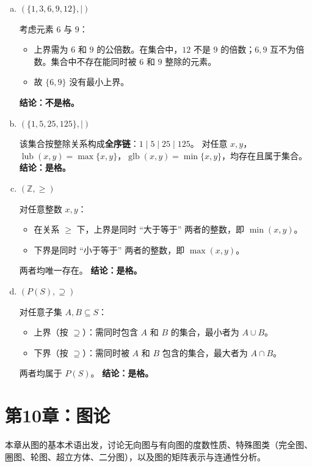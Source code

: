 \documentclass[11pt,UTF8]{article}
\begin{document}
\begin{enumerate}[a)]
    \item $(\{1, 3, 6, 9, 12\}, \mid)$
    
    考虑元素 $6$ 与 $9$：
    \begin{itemize}
        \item 上界需为 $6$ 和 $9$ 的公倍数。在集合中，$12$ 不是 $9$ 的倍数；$6,9$ 互不为倍数。集合中不存在能同时被 $6$ 和 $9$ 整除的元素。
        \item 故 $\{6,9\}$ 没有最小上界。
    \end{itemize}
    \textbf{结论：不是格。}

    \item $(\{1, 5, 25, 125\}, \mid)$
    
    该集合按整除关系构成\textbf{全序链}：$1 \mid 5 \mid 25 \mid 125$。
    对任意 $x,y$，$\operatorname{lub}(x,y) = \max\{x,y\}$，$\operatorname{glb}(x,y) = \min\{x,y\}$，均存在且属于集合。
    \textbf{结论：是格。}

    \item $(\mathbb{Z}, \ge)$
    
    对任意整数 $x,y$：
    \begin{itemize}
        \item 在关系 $\ge$ 下，上界是同时 ``大于等于'' 两者的整数，即 $\min(x,y)$。
        \item 下界是同时 ``小于等于'' 两者的整数，即 $\max(x,y)$。
    \end{itemize}
    两者均唯一存在。
    \textbf{结论：是格。}

    \item $(P(S), \supseteq)$
    
    对任意子集 $A,B \subseteq S$：
    \begin{itemize}
        \item 上界（按 $\supseteq$）：需同时包含 $A$ 和 $B$ 的集合，最小者为 $A \cup B$。
        \item 下界（按 $\supseteq$）：需同时被 $A$ 和 $B$ 包含的集合，最大者为 $A \cap B$。
    \end{itemize}
    两者均属于 $P(S)$。
    \textbf{结论：是格。}
\end{enumerate}

\newpage

\section{第10章：图论}

本章从图的基本术语出发，讨论无向图与有向图的度数性质、特殊图类（完全图、圈图、轮图、超立方体、二分图），以及图的矩阵表示与连通性分析。
\end{document}
